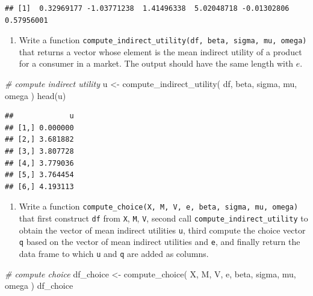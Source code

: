 \documentclass[
]{book}
\newenvironment{Shaded}{\begin{snugshade}}{\end{snugshade}}
\newcommand{\CommentTok}[1]{\textcolor[rgb]{0.56,0.35,0.01}{\textit{#1}}}
\newcommand{\FunctionTok}[1]{\textcolor[rgb]{0.00,0.00,0.00}{#1}}
\newcommand{\NormalTok}[1]{#1}
\newcommand{\OtherTok}[1]{\textcolor[rgb]{0.56,0.35,0.01}{#1}}
\providecommand{\tightlist}{%
  \setlength{\itemsep}{0pt}\setlength{\parskip}{0pt}}
\begin{document}
\begin{verbatim}
## [1]  0.32969177 -1.03771238  1.41496338  5.02048718 -0.01302806  0.57956001
\end{verbatim}

\begin{enumerate}
\def\labelenumi{\arabic{enumi}.}
\setcounter{enumi}{6}
\tightlist
\item
  Write a function \texttt{compute\_indirect\_utility(df,\ beta,\ sigma,\ mu,\ omega)} that returns a vector whose element is the mean indirect utility of a product for a consumer in a market. The output should have the same length with \(e\).
\end{enumerate}

\begin{Shaded}
\begin{Highlighting}[]
\CommentTok{\# compute indirect utility}
\NormalTok{u }\OtherTok{\textless{}{-}} 
  \FunctionTok{compute\_indirect\_utility}\NormalTok{(}
\NormalTok{    df, }
\NormalTok{    beta, }
\NormalTok{    sigma, }
\NormalTok{    mu, }
\NormalTok{    omega}
\NormalTok{    )}
\FunctionTok{head}\NormalTok{(u)}
\end{Highlighting}
\end{Shaded}

\begin{verbatim}
##             u
## [1,] 0.000000
## [2,] 3.681882
## [3,] 3.807728
## [4,] 3.779036
## [5,] 3.764454
## [6,] 4.193113
\end{verbatim}

\begin{enumerate}
\def\labelenumi{\arabic{enumi}.}
\setcounter{enumi}{7}
\tightlist
\item
  Write a function \texttt{compute\_choice(X,\ M,\ V,\ e,\ beta,\ sigma,\ mu,\ omega)} that first construct \texttt{df} from \texttt{X}, \texttt{M}, \texttt{V}, second call \texttt{compute\_indirect\_utility} to obtain the vector of mean indirect utilities \texttt{u}, third compute the choice vector \texttt{q} based on the vector of mean indirect utilities and \texttt{e}, and finally return the data frame to which \texttt{u} and \texttt{q} are added as columns.
\end{enumerate}

\begin{Shaded}
\begin{Highlighting}[]
\CommentTok{\# compute choice}
\NormalTok{df\_choice }\OtherTok{\textless{}{-}} 
  \FunctionTok{compute\_choice}\NormalTok{(}
\NormalTok{    X, }
\NormalTok{    M, }
\NormalTok{    V, }
\NormalTok{    e, }
\NormalTok{    beta, }
\NormalTok{    sigma, }
\NormalTok{    mu, }
\NormalTok{    omega}
\NormalTok{    )}
\NormalTok{df\_choice}
\end{Highlighting}
\end{Shaded}
\end{document}
